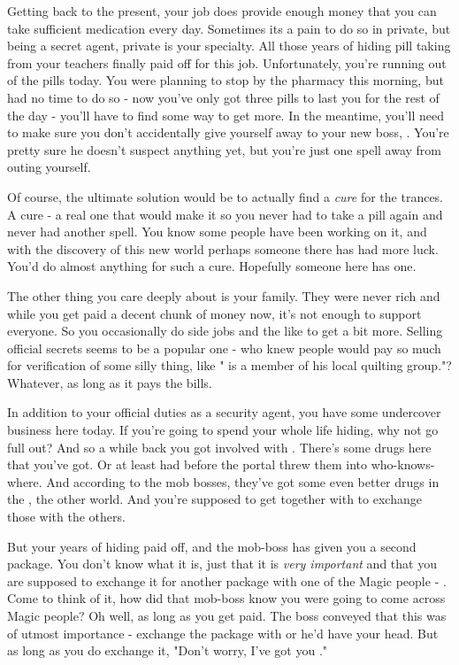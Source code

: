 \documentclass[char]{guildcamp3}
\begin{document}
Getting back to the present, your job does provide enough money that you can take sufficient medication every day. Sometimes its a pain to do so in private, but being a secret agent, private is your specialty. All those years of hiding pill taking from your teachers finally paid off for this job. Unfortunately, you're running out of the pills today. You were planning to stop by the pharmacy this morning, but had no time to do so - now you've only got three pills to last you for the rest of the day - you'll have to find some way to get more. In the meantime, you'll need to make sure you don't accidentally give yourself away to your new boss, \cSpecOpOne{}. You're pretty sure he doesn't suspect anything yet, but you're just one spell away from outing yourself. 

Of course, the ultimate solution would be to actually find a \emph{cure} for the trances. A cure - a real one that would make it so you never had to take a pill again and never had another spell. You know some people have been working on it, and with the discovery of this new world perhaps someone there has had more luck. You'd do almost anything for such a cure. Hopefully someone here has one.  

The other thing you care deeply about is your family. They were never rich and while you get paid a decent chunk of money now, it's not enough to support everyone. So you occasionally do side jobs and the like to get a bit more. Selling official secrets seems to be a popular one - who knew people would pay so much for verification of some silly thing, like "\cPoliOne{} is a member of his local quilting group."? Whatever, as long as it pays the bills. 

In addition to your official duties as a security agent, you have some undercover business here today. If you're going to spend your whole life hiding, why not go full out? And so a while back you got involved with \bTechMob{}. There's some drugs here that you've got. Or at least had before the portal threw them into who-knows-where. And according to the mob bosses, they've got some even better drugs in the \bMagicWorld{}, the other world. And you're supposed to get together with to exchange those with the others. 

But your years of hiding paid off, and the mob-boss has given you a second package. You don't know what it is, just that it is \emph{very important} and that you are supposed to exchange it for another package with one of the Magic people - \cServant{\intro}. Come to think of it, how did that mob-boss know you were going to come across Magic people? Oh well, as long as you get paid. The boss conveyed that this was of utmost importance - exchange the package with \cServant{} or he'd have your head. But as long as you do exchange it, "Don't worry, I've got you \cSpecOpTwo{\informal}." 
\end{document}

